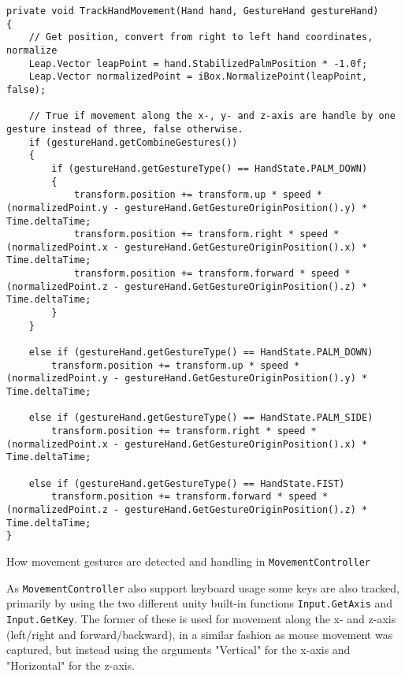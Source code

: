 \begin{table}
\label{table:movement_gesture_code}
\lstset{style=csharp}
\begin{lstlisting}
private void TrackHandMovement(Hand hand, GestureHand gestureHand)
{
    // Get position, convert from right to left hand coordinates, normalize
    Leap.Vector leapPoint = hand.StabilizedPalmPosition * -1.0f;
    Leap.Vector normalizedPoint = iBox.NormalizePoint(leapPoint, false);

    // True if movement along the x-, y- and z-axis are handle by one gesture instead of three, false otherwise.
    if (gestureHand.getCombineGestures()) 
    {
        if (gestureHand.getGestureType() == HandState.PALM_DOWN)
        {
            transform.position += transform.up * speed * (normalizedPoint.y - gestureHand.GetGestureOriginPosition().y) * Time.deltaTime;
            transform.position += transform.right * speed * (normalizedPoint.x - gestureHand.GetGestureOriginPosition().x) * Time.deltaTime;
            transform.position += transform.forward * speed * (normalizedPoint.z - gestureHand.GetGestureOriginPosition().z) * Time.deltaTime;
        }      
    }

    else if (gestureHand.getGestureType() == HandState.PALM_DOWN)
        transform.position += transform.up * speed * (normalizedPoint.y - gestureHand.GetGestureOriginPosition().y) * Time.deltaTime;

    else if (gestureHand.getGestureType() == HandState.PALM_SIDE)
        transform.position += transform.right * speed * (normalizedPoint.x - gestureHand.GetGestureOriginPosition().x) * Time.deltaTime;

    else if (gestureHand.getGestureType() == HandState.FIST)
        transform.position += transform.forward * speed * (normalizedPoint.z - gestureHand.GetGestureOriginPosition().z) * Time.deltaTime;
}                                                                              
\end{lstlisting}
\caption[How movement gestures are detected and handling in \texttt{MovementController}]{How movement gestures are detected and handling in \texttt{MovementController}} 
\end{table}

As \texttt{MovementController} also support keyboard usage some keys are also tracked, primarily by using the two different unity built-in functions \texttt{Input.GetAxis} 
and \texttt{Input.GetKey}. The former of these is used for movement along the x- and z-axis (left/right and forward/backward), in a similar fashion as 
mouse movement was captured, but instead using the arguments "Vertical" for the x-axis and "Horizontal" for the z-axis. 

